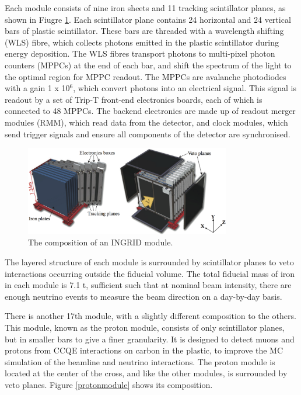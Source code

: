 Each module consists of nine iron sheets and 11 tracking scintillator planes, as shown in Fiugre \ref{ingridmodule}. Each scintillator plane contains 24 horizontal and 24 vertical bars of plastic scintillator. These bars are threaded with a wavelength shifting (WLS) fibre, which collects photons emitted in the plastic scintillator during energy deposition. The WLS fibres transport photons to multi-pixel photon counters (MPPCs) at the end of each bar, and shift the spectrum of the light to the optimal region for MPPC readout. The MPPCs are avalanche photodiodes with a gain 1 x 10$^6$, which convert photons into an electrical signal. This signal is readout by a set of Trip-T front-end electronics boards\cite{tript}, each of which is connected to 48 MPPCs. The backend electronics are made up of readout merger modules (RMM), which read data from the detector, and clock modules, which send trigger signals and ensure all components of the detector are synchronised.

\begin{figure}[!htbp]
\centering
\includegraphics*[width=0.8\textwidth,clip]{figs/ingridmodule}
\caption{The composition of an INGRID module.} \label{ingridmodule}
\end{figure}

The layered structure of each module is surrounded by scintillator planes to veto interactions occurring outside the fiducial volume. The total fiducial mass of iron in each module is 7.1 t, sufficient such that at nominal beam intensity, there are enough neutrino events to measure the beam direction on a day-by-day basis. 

There is another 17th module, with a slightly different composition to the others. This module, known as the proton module, consists of only scintillator planes, but in smaller bars to give a finer granularity. It is designed to detect muons and protons from CCQE interactions on carbon in the plastic, to improve the MC simulation of the beamline and neutrino interactions. The proton module is located at the center of the cross, and like the other modules, is surrounded by veto planes. Figure \ref{protonmodule} shows its composition.

